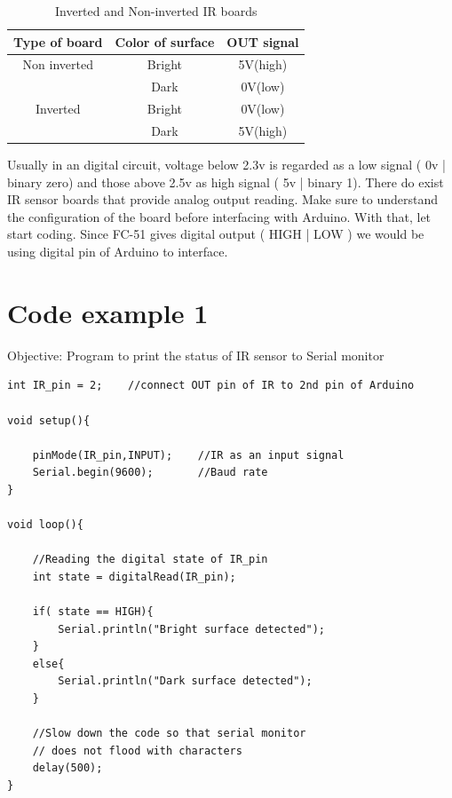 \begin{table}
    \centering
    \begin{tabular}{|c|c|c|}
    \hline
    \textbf{\hspace{0.4cm}Type of board\hspace{0.4cm}} & \textbf{\hspace{0.4cm} Color of surface\hspace{0.4cm} }& \textbf{\hspace{0.4cm}OUT signal\hspace{0.4cm}} \\
    \hline
    \centering Non inverted & Bright & 5V(high) \\ \cline{2-3} & Dark & 0V(low) \\
    \hline
    \centering Inverted & Bright & 0V(low) \\ \cline{2-3} & Dark & 5V(high) \\
    \hline
    \end{tabular}
    \caption{Inverted and Non-inverted IR boards}
    \label{tab:inverted}
\end{table}

\hspace{0.5cm}
\par Usually in an digital circuit, voltage below 2.3v is regarded as a low signal ( 0v | binary zero) and those above 2.5v as high signal ( 5v | binary 1). There do exist \ac{IR} sensor boards that provide analog output reading. Make sure to understand the configuration of the board before interfacing with Arduino. With that, let start coding. Since FC-51 gives digital output ( HIGH | LOW ) we would be using digital pin of Arduino to interface.

\section{\textbf{Code example 1}}
Objective: Program to print the status of \ac{IR} sensor to Serial monitor

\begin{lstlisting}[style=CStyle]
int IR_pin = 2;    //connect OUT pin of IR to 2nd pin of Arduino

void setup(){

    pinMode(IR_pin,INPUT);    //IR as an input signal
    Serial.begin(9600);       //Baud rate
}

void loop(){
    
    //Reading the digital state of IR_pin
    int state = digitalRead(IR_pin);	
    
    if( state == HIGH){
        Serial.println("Bright surface detected");
    }
    else{
        Serial.println("Dark surface detected");
    }
    
    //Slow down the code so that serial monitor
    // does not flood with characters
    delay(500);
} 
\end{lstlisting}

